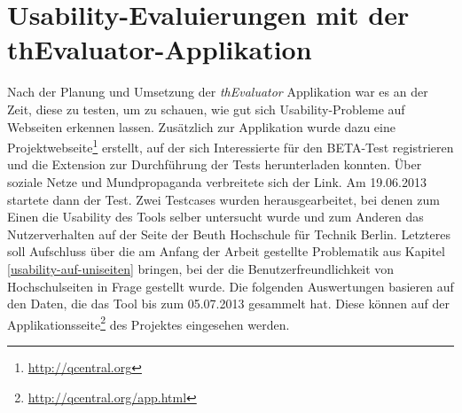 %
%
%
%

\chapter{Usability-Evaluierungen mit der thEvaluator-Applikation}

Nach der Planung und Umsetzung der \textit{thEvaluator} Applikation war es an der Zeit, diese zu testen, um zu schauen, wie gut sich Usability-Probleme auf Webseiten erkennen lassen. Zusätzlich zur Applikation wurde dazu eine Projektwebseite\footnote{\url{http://qcentral.org}} erstellt, auf der sich Interessierte für den BETA-Test registrieren und die Extension zur Durchführung der Tests herunterladen konnten. Über soziale Netze und Mundpropaganda verbreitete sich der Link. Am 19.06.2013 startete dann der Test. Zwei Testcases wurden herausgearbeitet, bei denen zum Einen die Usability des Tools selber untersucht wurde und zum Anderen das Nutzerverhalten auf der Seite der Beuth Hochschule für Technik Berlin. Letzteres soll Aufschluss über die am Anfang der Arbeit gestellte Problematik aus Kapitel \ref{usability-auf-uniseiten} bringen, bei der die Benutzerfreundlichkeit von Hochschulseiten in Frage gestellt wurde. Die folgenden Auswertungen basieren auf den Daten, die das Tool bis zum 05.07.2013 gesammelt hat. Diese können auf der Applikationsseite\footnote{\url{http://qcentral.org/app.html}} des Projektes eingesehen werden.

\newpage


